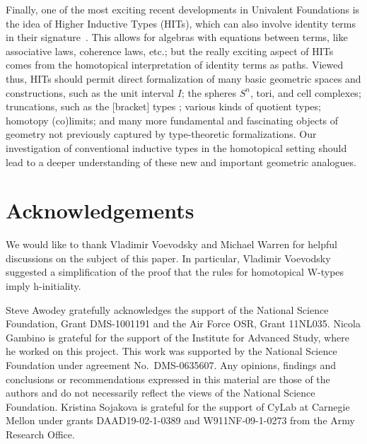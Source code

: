 \documentclass{article}
\theoremstyle{remark}
\theoremstyle{definition}
\begin{document}
\noindent Finally, one of the most exciting recent developments in Univalent Foundations is the 
idea of Higher Inductive Types (HITs), which can also involve identity terms in their signature~\cite{LumsdaineP:higit,ShulmanM:higit}.   This allows for algebras with equations between terms, like associative laws, coherence laws, etc.; but the really exciting aspect of HITs comes from the homotopical interpretation of identity terms as paths.  Viewed thus, HITs should permit direct formalization of many basic geometric spaces and constructions, such as the unit interval $I$; the spheres $S^n$, tori, and cell complexes; truncations, such as the [bracket] types \cite{AwodeyS:prot}; various kinds of quotient types; homotopy (co)limits; and many more fundamental and fascinating objects of geometry not previously captured by type-theoretic formalizations.  Our investigation of conventional inductive types in the homotopical setting should lead to a deeper understanding of these new and important geometric analogues. 



\section*{Acknowledgements}

\noindent We would like to thank Vladimir Voevodsky and Michael Warren for helpful discussions
on the subject of this paper. In particular, Vladimir Voevodsky suggested a simplification of the 
proof that the rules for homotopical W-types imply h-initiality.

Steve Awodey gratefully acknowledges the support of the National Science Foundation, Grant DMS-1001191
 and the Air Force OSR, Grant 11NL035.
Nicola Gambino is grateful for the support of the Institute for Advanced Study, where
he worked on this project. This work was supported by the National Science Foundation 
under agreement No.\ DMS-0635607. Any opinions, findings and conclusions or recommendations
expressed in this material are those of the authors and do not necessarily reflect the views of
the National Science Foundation.
Kristina Sojakova is grateful for the support of CyLab at Carnegie
Mellon under grants DAAD19-02-1-0389 and W911NF-09-1-0273 from the Army
Research Office.
\end{document}
